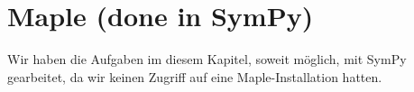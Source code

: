 \chapter{Maple (done in SymPy)}

\addtocounter{section}{44}

Wir haben die Aufgaben im diesem Kapitel, soweit möglich, mit SymPy gearbeitet, da wir keinen Zugriff auf eine Maple-Installation hatten.








